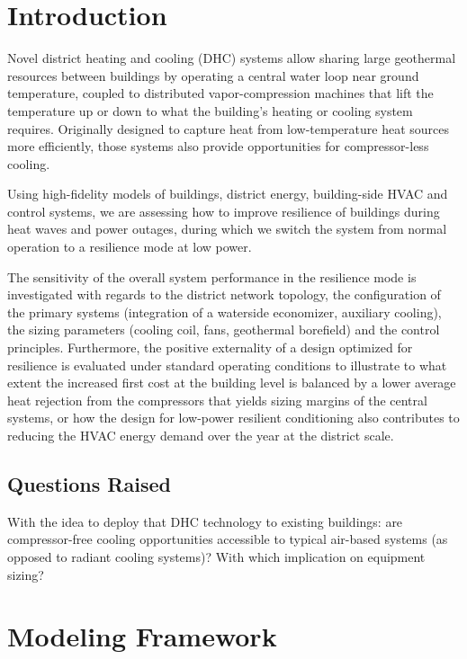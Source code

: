 \section{Introduction} \label{sec:intro}

Novel district heating and cooling (DHC) systems allow sharing large geothermal resources between buildings by operating a central water loop near ground temperature, coupled to distributed vapor-compression machines that lift the temperature up or down to what the building’s heating or cooling system requires.
Originally designed to capture heat from low-temperature heat sources more efficiently, those systems also provide opportunities for compressor-less cooling.

Using high-fidelity models of buildings, district energy, building-side HVAC and control systems, we are assessing how to improve resilience of buildings during heat waves and power outages, during which we switch the system from normal operation to a resilience mode at low power.

The sensitivity of the overall system performance in the resilience mode is investigated with regards to the district network topology, the configuration of the primary systems (integration of a waterside economizer, auxiliary cooling), the sizing parameters (cooling coil, fans, geothermal borefield) and the control principles.
Furthermore, the positive externality of a design optimized for resilience is evaluated under standard operating conditions to illustrate to what extent the increased first cost at the building level is balanced by a lower average heat rejection from the compressors that yields sizing margins of the central systems, or how the design for low-power resilient conditioning also contributes to reducing the HVAC energy demand over the year at the district scale.

\subsection{Questions Raised} \label{sec:questions}

With the idea to deploy that DHC technology to existing buildings: are compressor-free cooling opportunities accessible to typical air-based systems (as opposed to radiant cooling systems)? With which implication on equipment sizing?


\section{Modeling Framework} \label{sec:modeling}


